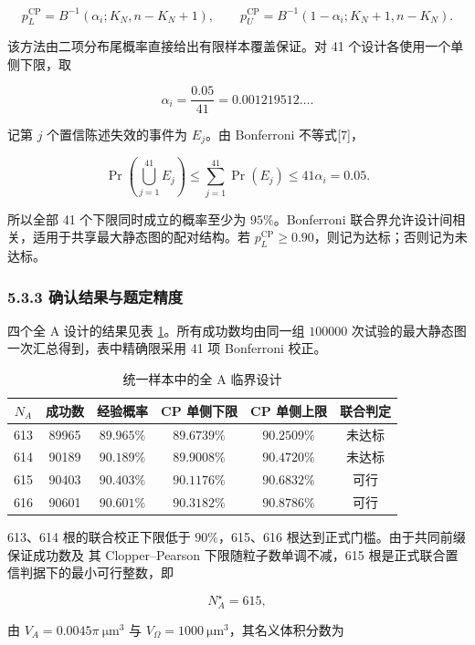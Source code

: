 \[
p_L^{\mathrm{CP}}=B^{-1}(\alpha_i;K_N,n-K_N+1),\qquad
p_U^{\mathrm{CP}}=B^{-1}(1-\alpha_i;K_N+1,n-K_N).
\]

该方法由二项分布尾概率直接给出有限样本覆盖保证。对 41 个设计各使用一个单侧下限，取

\[
\alpha_i=\frac{0.05}{41}=0.001219512\ldots.
\]

记第 \(j\) 个置信陈述失效的事件为 \(E_j\)。由 Bonferroni 不等式{[}7{]}，

\[
\Pr\!\left(\bigcup_{j=1}^{41}E_j\right)
\le \sum_{j=1}^{41}\Pr(E_j)\le41\alpha_i=0.05.
\]

所以全部 41 个下限同时成立的概率至少为 \(95\%\)。Bonferroni 联合界允许设计间相关，适用于共享最大静态图的配对结构。若 \(p_L^{\mathrm{CP}}\geq0.90\)，则记为达标；否则记为未达标。

\subsubsection{5.3.3 确认结果与题定精度}\label{ux786eux8ba4ux7ed3ux679cux4e0eux9898ux5b9aux7cbeux5ea6}

四个全 A 设计的结果见表 \ref{tab:q3-confirmation}。所有成功数均由同一组 \(100000\) 次试验的最大静态图一次汇总得到，表中精确限采用 41 项 Bonferroni 校正。

\begin{table}[htbp]
  \centering
  \small
  \caption{统一样本中的全 A 临界设计}
  \label{tab:q3-confirmation}
  \begin{tabular}{cccccc}
    \toprule
    $N_A$ & 成功数 & 经验概率 & CP 单侧下限 & CP 单侧上限 & 联合判定 \\
    \midrule
    613 & 89965 & $89.965\%$ & $89.6739\%$ & $90.2509\%$ & 未达标 \\
    614 & 90189 & $90.189\%$ & $89.9008\%$ & $90.4720\%$ & 未达标 \\
    615 & 90403 & $90.403\%$ & $90.1176\%$ & $90.6832\%$ & 可行 \\
    616 & 90601 & $90.601\%$ & $90.3182\%$ & $90.8786\%$ & 可行 \\
    \bottomrule
  \end{tabular}
\end{table}

613、614 根的联合校正下限低于 \(90\%\)，615、616 根达到正式门槛。由于共同前缀保证成功数及 其 Clopper--Pearson 下限随粒子数单调不减，615 根是正式联合置信判据下的最小可行整数，即

\[
N_A^\star=615,
\]

由 \(V_A=0.0045\pi\ \mathrm{\mu m^3}\) 与 \(V_\Omega=1000\ \mathrm{\mu m^3}\)，其名义体积分数为

